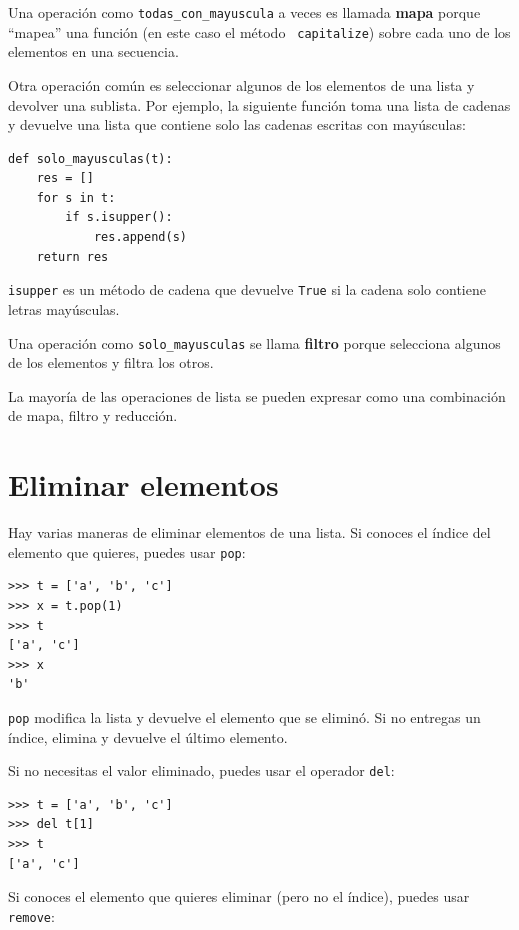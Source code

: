 \documentclass[10pt]{book}
\begin{document}
Una operación como \verb"todas_con_mayuscula" a veces es llamada {\bf
mapa} porque ``mapea'' una función (en este caso el método {\tt
capitalize}) sobre cada uno de los elementos en una secuencia.

Otra operación común es seleccionar algunos de los elementos de
una lista y devolver una sublista.  Por ejemplo, la siguiente
función toma una lista de cadenas y devuelve una lista que contiene
solo las cadenas escritas con mayúsculas:

\begin{verbatim}
def solo_mayusculas(t):
    res = []
    for s in t:
        if s.isupper():
            res.append(s)
    return res
\end{verbatim}
%
{\tt isupper} es un método de cadena que devuelve {\tt True} si
la cadena solo contiene letras mayúsculas.

Una operación como \verb"solo_mayusculas" se llama {\bf filtro} porque
selecciona algunos de los elementos y filtra los otros.

La mayoría de las operaciones de lista se pueden expresar como una combinación
de mapa, filtro y reducción.


\section{Eliminar elementos}

Hay varias maneras de eliminar elementos de una lista.  Si conoces
el índice del elemento que quieres, puedes usar
{\tt pop}:

\begin{verbatim}
>>> t = ['a', 'b', 'c']
>>> x = t.pop(1)
>>> t
['a', 'c']
>>> x
'b'
\end{verbatim}
%
{\tt pop} modifica la lista y devuelve el elemento que se eliminó.
Si no entregas un índice, elimina y devuelve el
último elemento.

Si no necesitas el valor eliminado, puedes usar el
operador {\tt del}:

\begin{verbatim}
>>> t = ['a', 'b', 'c']
>>> del t[1]
>>> t
['a', 'c']
\end{verbatim}
%
Si conoces el elemento que quieres eliminar (pero no el índice),
puedes usar {\tt remove}:
\end{document}
